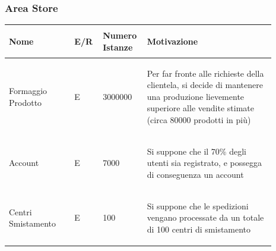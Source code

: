 \documentclass[12pt,a4paper]{article}
\begin{document}
\subsubsection{Area Store}
\begin{center}\setlength{\extrarowheight}{1.5pt}\begin{longtable}{|p{0.23\linewidth}|p{0.1\linewidth}|p{0.11\linewidth}|p{0.45\linewidth}|}
\hline \textbf{Nome}   & \begin{center}\vspace{-15pt}\textbf{E/R}\end{center} & \textbf{Numero Istanze} & \textbf{Motivazione}\\ 

    
\hline
 Formaggio Prodotto
 & 
\begin{center}\vspace{-25pt}E\end{center}
 & 
\begin{center}\vspace{-25pt}3000000\end{center}
 & 
\begin{flushleft}\vspace{-25pt}Per far fronte alle richieste della clientela, si decide di mantenere una produzione lievemente superiore alle vendite stimate (circa 80000 prodotti in più)\end{flushleft}
\\

\hline
Account
 & 
\begin{center}\vspace{-25pt}E\end{center}
 & 
\begin{center}\vspace{-25pt}7000\end{center}
 & 
\begin{flushleft}\vspace{-25pt}Si suppone che il 70\% degli utenti sia registrato, e possegga di conseguenza un account\end{flushleft}
\\

\hline
Centri Smistamento
 & 
\begin{center}\vspace{-25pt}E\end{center}
 & 
\begin{center}\vspace{-25pt}100\end{center}
 & 
\begin{flushleft}\vspace{-25pt}Si suppone che le spedizioni vengano processate da un totale di 100 centri di smistamento\end{flushleft}
\\


\end{longtable}
\end{center}
\end{document}
